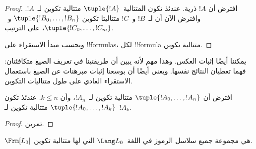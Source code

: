 \documentclass[../../../include/open-logic-section]{subfiles}
\begin{document}
\begin{proof}
افترض أن $!A$ ذرية. عندئذ تكون المتتالية~$\tuple{!A}$ متتالية
تكوين لـ~$!A$.
%
وافترض الآن أن لـ~$!B$ و~$!C$ متتاليتا تكوين
$\tuple{!B_0,\dotsc,!B_n}$ و~$\tuple{!C_0,\dotsc,!C_m}$،
على الترتيب.
%
\begin{enumerate}
\end{enumerate}
وبحسب مبدأ الاستقراء على !!{formula}s، لكل
!!{formula} متتالية تكوين.
\end{proof}

يمكننا أيضًا إثبات العكس. وهذا مهم لأنه يبين أن طريقتينا في تعريف
الصيغ متكافئتان: فهما تعطيان النتائج نفسها. ويعني أيضًا أن بوسعنا
إثبات مبرهنات عن الصيغ باستعمال الاستقراء العادي على طول متتاليات
التكوين.

\begin{lem}
افترض أن $\tuple{!A_0,\dotsc,!A_n}$ متتالية تكوين لـ~$!A_n$، وأن
$k \leq n$. عندئذ تكون $\tuple{!A_0,\dotsc,!A_k}$ متتالية تكوين
لـ~$!A_k$.
\end{lem}

\begin{proof}
تمرين.
\end{proof}

\begin{thm}
$\Frm[L_0]$ هي مجموعة جميع سلاسل الرموز في اللغة~$\Lang L_0$ التي
لها متتالية تكوين.
\end{thm}
\end{document}
